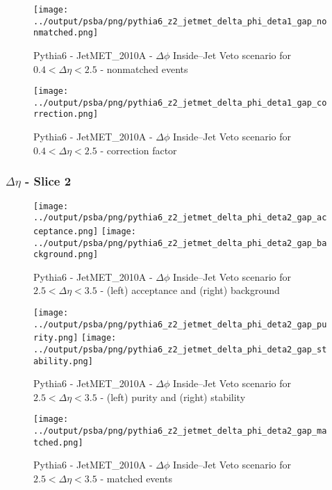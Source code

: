 \documentclass[11pt]{book}
\begin{document}
\begin{figure}[ht]
\centering
\texttt{[image: ../output/psba/png/pythia6\_z2\_jetmet\_delta\_phi\_deta1\_gap\_nonmatched.png]}
\caption{Pythia6 - JetMET\_2010A - $\Delta\phi$ Inside--Jet Veto scenario for $0.4 < \Delta\eta < 2.5$ - nonmatched events}
\label{fig:p6_jetmet_delta_phi_deta1_gap_nonmatched}
\end{figure}

\begin{figure}[ht]
\centering
\texttt{[image: ../output/psba/png/pythia6\_z2\_jetmet\_delta\_phi\_deta1\_gap\_correction.png]}
\caption{Pythia6 - JetMET\_2010A - $\Delta\phi$ Inside--Jet Veto scenario for $0.4 < \Delta\eta < 2.5$ - correction factor}
\label{fig:p6_jetmet_delta_phi_deta1_gap_correction}
\end{figure}

\clearpage
\subsubsection{$\Delta\eta$ - Slice 2}
\begin{figure}[ht]
\centering
\texttt{[image: ../output/psba/png/pythia6\_z2\_jetmet\_delta\_phi\_deta2\_gap\_acceptance.png]}
\texttt{[image: ../output/psba/png/pythia6\_z2\_jetmet\_delta\_phi\_deta2\_gap\_background.png]}
\caption{Pythia6 - JetMET\_2010A - $\Delta\phi$ Inside--Jet Veto scenario for $2.5 < \Delta\eta < 3.5$ - (left) acceptance and (right) background}
\label{fig:p6_jetmet_delta_phi_deta2_gap_ab}
\end{figure}

\begin{figure}[ht]
\centering
\texttt{[image: ../output/psba/png/pythia6\_z2\_jetmet\_delta\_phi\_deta2\_gap\_purity.png]}
\texttt{[image: ../output/psba/png/pythia6\_z2\_jetmet\_delta\_phi\_deta2\_gap\_stability.png]}
\caption{Pythia6 - JetMET\_2010A - $\Delta\phi$ Inside--Jet Veto scenario for $2.5 < \Delta\eta < 3.5$ - (left) purity and (right) stability}
\label{fig:p6_jetmet_delta_phi_deta2_gap_ps}
\end{figure}

\begin{figure}[ht]
\centering
\texttt{[image: ../output/psba/png/pythia6\_z2\_jetmet\_delta\_phi\_deta2\_gap\_matched.png]}
\caption{Pythia6 - JetMET\_2010A - $\Delta\phi$ Inside--Jet Veto scenario for $2.5 < \Delta\eta < 3.5$ - matched events}
\label{fig:p6_jetmet_delta_phi_deta2_gap_matched}
\end{figure}
\end{document}
